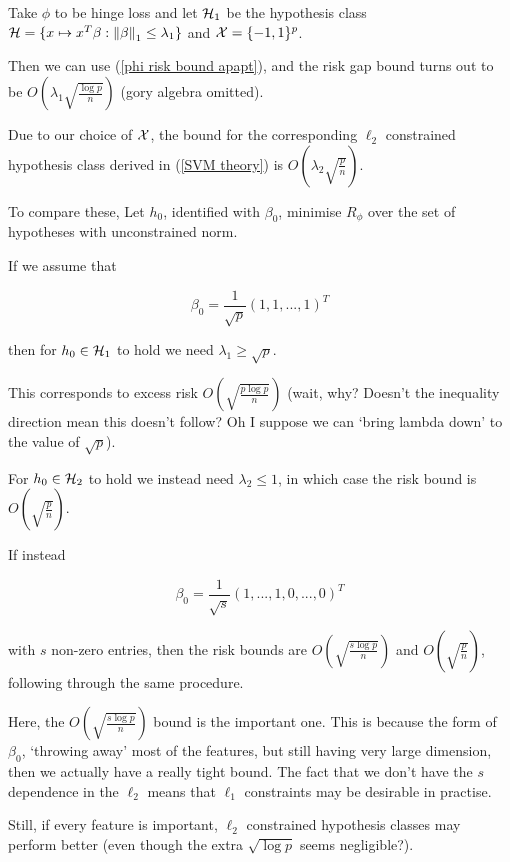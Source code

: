 \documentclass[11pt]{scrartcl}
\begin{document}
\begin{example}
Take $\phi$ to be hinge loss and let $\mathcal{H}_1$ be the hypothesis class $\mathcal{H} = \{ x \mapsto x^T \beta : \left\lVert\beta\right\rVert_1 \le \lambda_1 \}$ and $\mathcal{X} = \{ -1, 1 \}^p$.

Then we can use (\ref{phi risk bound apapt}), and the risk gap bound turns out to be $O\left( \lambda_1 \sqrt{\frac{\log p}{n}} \right)$ (gory algebra omitted).

Due to our choice of $\mathcal{X}$, the bound for the corresponding $\ell_2$ constrained hypothesis class derived in (\ref{SVM theory}) is $O\left( \lambda_2 \sqrt{\frac{p}{n}} \right)$.

To compare these, Let $h_0$, identified with $\beta_0$, minimise $R_\phi$ over the set of hypotheses with unconstrained norm.

\begin{example}
If we assume that 

\begin{equation}
\beta_0 = \frac{1}{\sqrt{p}} (1,1,...,1)^T
\end{equation}

then for $h_0 \in \mathcal{H}_1$ to hold we need $\lambda_1 \ge \sqrt{p}$.

This corresponds to excess risk $O\left(\sqrt{\frac{p \log p}{n}} \right)$ (wait, why? Doesn't the inequality direction mean this doesn't follow? Oh I suppose we can `bring lambda down' to the value of $\sqrt{p}$).

For $h_0 \in \mathcal{H}_2$ to hold we instead need $\lambda_2 \le 1$, in which case the risk bound is $O\left( \sqrt{\frac{p}{n}} \right)$.
\end{example}

\begin{example}
If instead

\begin{equation}
\beta_0 = \frac{1}{\sqrt{s}} (1,...,1,0,...,0)^T
\end{equation}

with $s$ non-zero entries, then the risk bounds are $O\left( \sqrt{\frac{s \log p}{n}} \right)$ and $O\left( \sqrt{\frac{p}{n}} \right)$, following through the same procedure.

Here, the $O\left( \sqrt{\frac{s \log p}{n}} \right)$ bound is the important one. This is because the form of $\beta_0$, `throwing away' most of the features, but still having very large dimension, then we actually have a really tight bound. The fact that we don't have the $s$ dependence in the $\ell_2$ means that $\ell_1$ constraints may be desirable in practise.

Still, if every feature is important, $\ell_2$ constrained hypothesis classes may perform better (even though the extra $\sqrt{\log p}$ seems negligible?).
\end{example}
\end{example}
\end{document}
